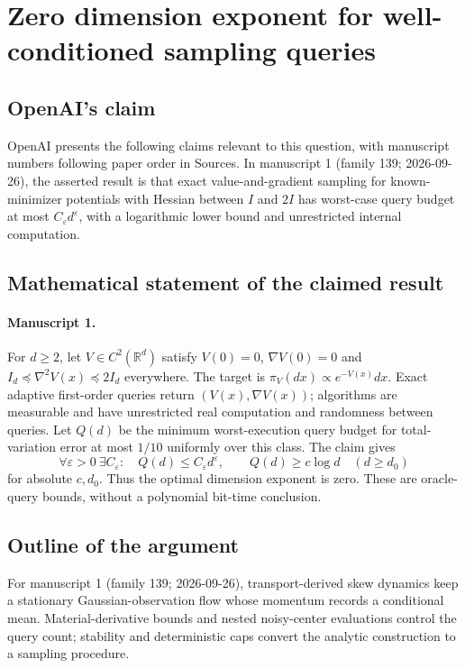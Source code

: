\documentclass[11pt]{article}
\begin{document}
\section*{Zero dimension exponent for well-conditioned sampling queries}

\subsection{OpenAI's claim}
OpenAI presents the following claims relevant to this question, with manuscript numbers following paper order in Sources. In manuscript 1 (family 139; 2026-09-26), the asserted result is that exact value-and-gradient sampling for known-minimizer potentials with Hessian between $I$ and $2I$ has worst-case query budget at most $C_\varepsilon d^\varepsilon$, with a logarithmic lower bound and unrestricted internal computation.

\subsection{Mathematical statement of the claimed result}
\paragraph{Manuscript 1.}
For $d\ge2$, let $V\in C^2(\mathbb R^d)$ satisfy $V(0)=0$, $\nabla V(0)=0$ and $I_d\preceq\nabla^2V(x)\preceq2I_d$ everywhere. The target is $\pi_V(dx)\propto e^{-V(x)}dx$. Exact adaptive first-order queries return $(V(x),\nabla V(x))$; algorithms are measurable and have unrestricted real computation and randomness between queries. Let $Q(d)$ be the minimum worst-execution query budget for total-variation error at most $1/10$ uniformly over this class. The claim gives
\[
 \forall\varepsilon>0\ \exists C_{\varepsilon}:\quad Q(d)\le C_{\varepsilon} d^{\varepsilon},
 \qquad Q(d)\ge c\log d\quad(d\ge d_0)
\]
for absolute $c,d_0$. Thus the optimal dimension exponent is zero. These are oracle-query bounds, without a polynomial bit-time conclusion.

\subsection{Outline of the argument}
For manuscript 1 (family 139; 2026-09-26), transport-derived skew dynamics keep a stationary Gaussian-observation flow whose momentum records a conditional mean. Material-derivative bounds and nested noisy-center evaluations control the query count; stability and deterministic caps convert the analytic construction to a sampling procedure.
\end{document}
